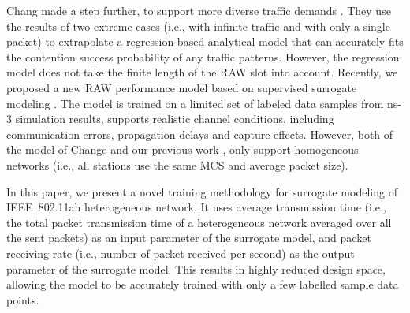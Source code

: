 Chang  made a step further, to support more diverse traffic demands \cite{Chang2018}. They use the results of two extreme cases (i.e., with infinite traffic and with only a single packet) to extrapolate a regression-based analytical model that can accurately fits the contention success probability of any traffic patterns. However, the regression model does not take the finite length of the RAW slot into account.
 Recently, we proposed a new RAW performance model based on supervised surrogate modeling \cite{wowmom2018}. The model is trained on a limited set of labeled data samples from ns-3 simulation results, supports realistic channel conditions, including communication errors, propagation delays and capture effects. However, both of the model of Change \cite{Chang2018} and our previous work \cite{wowmom2018}, only support homogeneous networks (i.e., all stations use the same MCS and average packet size). 
 
 
 
 In this paper, we present a novel training methodology for surrogate modeling of IEEE~802.11ah heterogeneous network. It uses average transmission time (i.e., the total packet transmission time of a heterogeneous network averaged over all the sent packets) as an input parameter of the surrogate model, and packet receiving rate (i.e., number of packet received per second) as the output parameter of the surrogate model. This results in highly reduced design space, allowing the model to be accurately trained with only a few labelled sample data points. 







